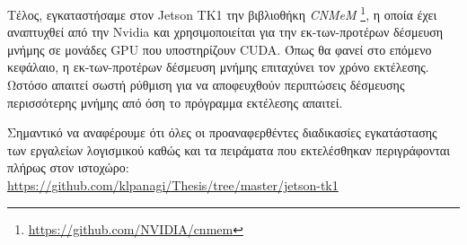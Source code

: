 Τέλος, εγκαταστήσαμε στον Jetson TK1 την βιβλιοθήκη \emph{CNMeM}
\footnote{\href{https://github.com/NVIDIA/cnmem}{https://github.com/NVIDIA/cnmem}},
η οποία έχει αναπτυχθεί από την Nvidia και χρησιμοποιείται για την εκ-των-προτέρων
δέσμευση μνήμης σε μονάδες GPU που υποστηρίζουν CUDA.
Όπως θα φανεί στο επόμενο κεφάλαιο, η εκ-των-προτέρων δέσμευση μνήμης
επιταχύνει τον χρόνο εκτέλεσης. Ωστόσο απαιτεί σωστή ρύθμιση για να
αποφευχθούν περιπτώσεις δέσμευσης περισσότερης μνήμης από όση το
πρόγραμμα εκτέλεσης απαιτεί.

Σημαντικό να αναφέρουμε ότι όλες οι προαναφερθέντες διαδικασίες εγκατάστασης των
εργαλείων λογισμικού καθώς και τα πειράματα που εκτελέσθηκαν περιγράφονται πλήρως στον
ιστοχώρο: %
\\

\href{https://github.com/klpanagi/Thesis/tree/master/jetson-tk1}{https://github.com/klpanagi/Thesis/tree/master/jetson-tk1}


